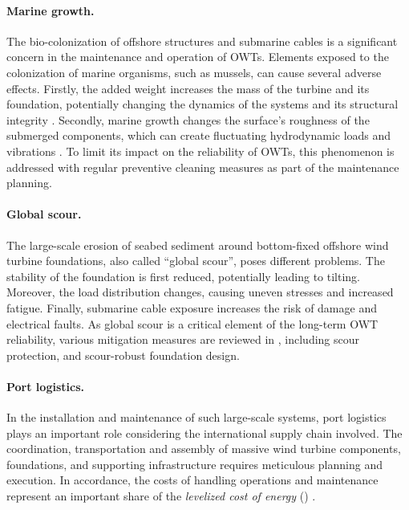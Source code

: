 

\paragraph{Marine growth.}
The bio-colonization of offshore structures and submarine cables is a significant concern in the maintenance and operation of OWTs. 
Elements exposed to the colonization of marine organisms, such as mussels, can cause several adverse effects. 
Firstly, the added weight increases the mass of the turbine and its foundation, potentially changing the dynamics of the systems and its structural integrity \citep{ameryoun_2019_marine_growth,schoefs_2022_reliability_marine_growth}. 
Secondly, marine growth changes the surface's roughness of the submerged components, which can create fluctuating hydrodynamic loads and vibrations \citep{marty_2021_cable_marine_growth}. 
To limit its impact on the reliability of OWTs, this phenomenon is addressed with regular preventive cleaning measures as part of the maintenance planning. 


\paragraph{Global scour.}
The large-scale erosion of seabed sediment around bottom-fixed offshore wind turbine foundations, also called ``global scour'', poses different problems. 
The stability of the foundation is first reduced, potentially leading to tilting. 
Moreover, the load distribution changes, causing uneven stresses and increased fatigue. 
Finally, submarine cable exposure increases the risk of damage and electrical faults. 
As global scour is a critical element of the long-term OWT reliability, various mitigation measures are reviewed in \citet{fazeres_2021_scour}, including scour protection, and scour-robust foundation design.


\paragraph{Port logistics.}
In the installation and maintenance of such large-scale systems, port logistics plays an important role considering the international supply chain involved. 
The coordination, transportation and assembly of massive wind turbine components, foundations, and supporting infrastructure requires meticulous planning and execution. 
In accordance, the costs of handling operations and maintenance represent an important share of the \textit{levelized cost of energy} () \citep{shields_2021_owt_lcoe}.  

